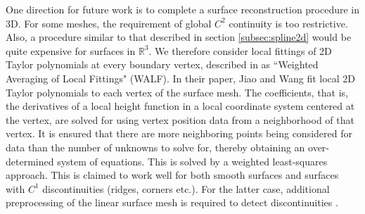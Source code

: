One direction for future work is to complete a surface reconstruction procedure in 3D. For some meshes, the requirement of global $C^2$ continuity is too restrictive. Also, a procedure similar to that described in section \ref{subsec:spline2d} would be quite expensive for surfaces in $\mathbb{R}^3$. We therefore consider local fittings of 2D Taylor polynomials at every boundary vertex, described in \cite{sr:jiaowang} as ``Weighted Averaging of Local Fittings" (WALF). In their paper, Jiao and Wang fit local 2D Taylor polynomials to each vertex of the surface mesh. The coefficients, that is, the derivatives of a local height function in a local coordinate system centered at the vertex, are solved for using vertex position data from a neighborhood of that vertex. It is ensured that there are more neighboring points being considered for data than the number of unknowns to solve for, thereby obtaining an over-determined system of equations. This is solved by a weighted least-squares approach. This is claimed to work well for both smooth surfaces and surfaces with $C^1$ discontinuities (ridges, corners etc.). For the latter case, additional preprocessing of the linear surface mesh is required to detect discontinuities \cite{sr:discontinuities}.
